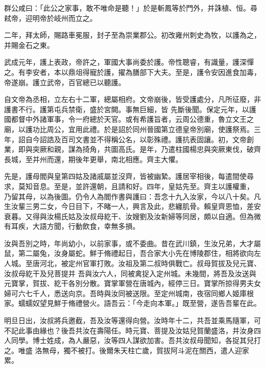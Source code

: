 \begin{pinyinscope}
 群公咸曰：「此公之家事，敢不唯命是聽！」於是斬鳳等於門外，并誅植、恒。尋弒帝，迎明帝於岐州而立之。



 二年，拜太師，賜路車冕服，封子至為崇業郡公。初改雍州刺史為牧，以護為之，并賜金石之東。



 武成元年，護上表政，帝許之，軍國大事尚委於護。帝性聰睿，有識量，護深憚之。有李安者，本以鼎俎得寵於護，擢為膳部下大夫。至是，護令安因進食加毒，帝遂崩。護立武帝，百官總已以聽護。



 自文帝為丞相，立左右十二軍，總屬相府。文帝崩後，皆受護處分，凡所征廢，非護書不行。護第屯兵禁衛，盛於宮闕。事無巨細，皆
 先斷後聞。保定元年，以護國都督中外諸軍事，令一府總於天官。或有希護旨者，云周公德重，魯立文王之廟，以護功比周公，宜用此禮。於是詔於同州晉國第立德皇帝別廟，使護祭焉。三年，詔自今詔誥及百司文書並不得稱公名，以彰殊禮。護抗表固讓。初，文帝創業，即與突厥和親，謀為掎角，共圖高氏。是年，乃遣柱國楊忠與突厥東伐，破齊長城，至并州而還，期後年更舉，南北相應。齊主大懼。



 先是，護母閻與皇第四姑及諸戚屬並沒齊，皆被幽縶。護居宰相後，每遣間使尋求，莫知音息。至是，並許還朝，且請和好。四年，皇姑先至。齊主以護權重，
 乃留其母，以為後圖。仍令人為閻作書與護曰：吾念十九入汝家，今以八十矣。凡生汝輩三男二女，今日目下，不睹一人，興言及此，悲纏肌骨。賴皇齊恩恤，差安衰暮。又得與汝楊氏姑及汝叔母紇干、汝嫂劉及汝新婦等同居，頗以自適。但為微有耳疾，大語方聞，行動飲食，幸無多損。



 汝與吾別之時，年尚幼小，以前家事，或不委曲。昔在武川鎮，生汝兄弟，大才屬鼠，第二屬兔，汝身屬蛇。鮮于脩禮起日，吾合家大小先在博陵郡住，相將欲向左人城。至唐河北，被定州官軍打敗。汝祖及第二叔時俱戰亡。叔母賀拔及兒元寶、汝叔母紇干及兒菩提并
 吾與汝六人，同被禽捉入定州城。未幾間，將吾及汝送與元寶掌，賀拔、紇干各別分散。寶掌軍營在唐城內，經停三日。寶掌所掠得男夫女婦可六七千人，悉送向京。吾時與汝同被送限。至定州城南，夜宿同鄉人姬庫根家。蠕蠕奴望見鮮于脩禮營火。語吾云：「今走向本軍。」既至營，遂告吾輩在此。



 明旦日出，汝叔將兵邀截，吾及汝等還得向營。汝時年十二，共吾並乘馬隨軍，可不記此事由緣也？後吾共汝在壽陽任。時元寶、菩提及汝姑兒賀蘭盛洛，并汝身四人同學。博士姓成，為人嚴惡，汝等四人謀欲加害。吾共汝叔母聞知，各捉其兒打之。唯盛
 洛無母，獨不被打。後爾朱天柱亡歲，賀拔阿斗泥在關西，遣人迎家累。




\end{pinyinscope}
